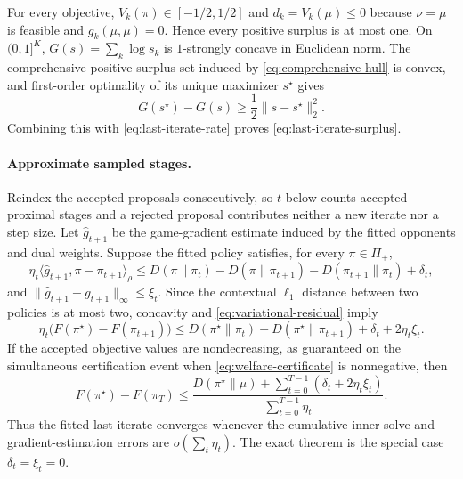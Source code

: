 \documentclass{article}
\theoremstyle{remark}
\theoremstyle{plain}
\begin{document}
For every objective, $V_k(\pi)\in[-1/2,1/2]$ and $d_k=V_k(\mu)\le0$ because $\nu=\mu$ is feasible and $g_k(\mu,\mu)=0$. Hence every positive surplus is at most one. On $(0,1]^K$, $G(s)=\sum_k\log s_k$ is $1$-strongly concave in Euclidean norm. The comprehensive positive-surplus set induced by \eqref{eq:comprehensive-hull} is convex, and first-order optimality of its unique maximizer $s^\star$ gives
\begin{equation}
G(s^\star)-G(s)
\ge\frac12\|s-s^\star\|_2^2.
\label{eq:surplus-strong-concavity}
\end{equation}
Combining this with \eqref{eq:last-iterate-rate} proves \eqref{eq:last-iterate-surplus}.

\paragraph{Approximate sampled stages.}
Reindex the accepted proposals consecutively, so $t$ below counts accepted proximal stages and a rejected proposal contributes neither a new iterate nor a step size. Let $\widehat g_{t+1}$ be the game-gradient estimate induced by the fitted opponents and dual weights. Suppose the fitted policy satisfies, for every $\pi\in\Pi_+$,
\begin{equation}
\eta_t\langle\widehat g_{t+1},\pi-\pi_{t+1}\rangle_\rho
\le
D(\pi\|\pi_t)-D(\pi\|\pi_{t+1})-D(\pi_{t+1}\|\pi_t)+\delta_t,
\label{eq:variational-residual}
\end{equation}
and $\|\widehat g_{t+1}-g_{t+1}\|_\infty\le\xi_t$. Since the contextual $\ell_1$ distance between two policies is at most two, concavity and \eqref{eq:variational-residual} imply
\begin{equation}
\eta_t\big(F(\pi^\star)-F(\pi_{t+1})\big)
\le
D(\pi^\star\|\pi_t)-D(\pi^\star\|\pi_{t+1})
+\delta_t+2\eta_t\xi_t.
\label{eq:inexact-telescope}
\end{equation}
If the accepted objective values are nondecreasing, as guaranteed on the simultaneous certification event when \eqref{eq:welfare-certificate} is nonnegative, then
\begin{equation}
F(\pi^\star)-F(\pi_T)
\le
\frac{D(\pi^\star\|\mu)+\sum_{t=0}^{T-1}(\delta_t+2\eta_t\xi_t)}
{\sum_{t=0}^{T-1}\eta_t}.
\label{eq:inexact-last-iterate}
\end{equation}
Thus the fitted last iterate converges whenever the cumulative inner-solve and gradient-estimation errors are $o(\sum_t\eta_t)$. The exact theorem is the special case $\delta_t=\xi_t=0$.
\end{document}
